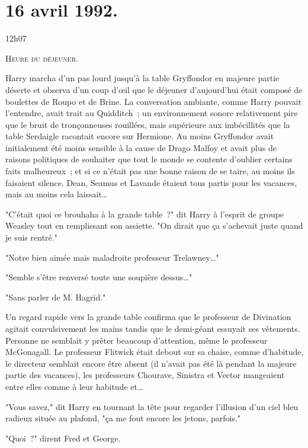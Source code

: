 
\section{16 avril 1992.}

12h07

\lettrine{H}{eure du déjeuner.}

\hplettrineextrapara
Harry marcha d'un pas lourd jusqu'à la table Gryffondor en majeure partie déserte et observa d'un coup d'œil que le déjeuner d'aujourd'hui était composé de boulettes de Roupo et de Brine. La conversation ambiante, comme Harry pouvait l'entendre, avait trait au Quidditch~; un environnement sonore relativement pire que le bruit de tronçonneuses rouillées, mais supérieure aux imbécillités que la table Serdaigle racontait encore sur Hermione. Au moins Gryffondor avait initialement été moins sensible à la cause de Drago Malfoy et avait plus de raisons politiques de souhaiter que tout le monde se contente d'oublier certains faits malheureux~; et si ce n'était pas une bonne raison de se taire, au moins ils faisaient silence. Dean, Seamus et Lavande étaient tous partis pour les vacances, mais au moins cela laissait…

"C'était quoi ce brouhaha à la grande table~?" dit Harry à l'esprit de groupe Weasley tout en remplissant son assiette. "On dirait que ça s'achevait juste quand je suis rentré."

"Notre bien aimée mais maladroite professeur Trelawney…"

"Semble s'être renversé toute une soupière dessus…"

"Sans parler de M. Hagrid."

Un regard rapide vers la grande table confirma que le professeur de Divination agitait convulsivement les mains tandis que le demi-géant essuyait ses vêtements. Personne ne semblait y prêter beaucoup d'attention, même le professeur McGonagall. Le professeur Flitwick était debout sur sa chaise, comme d'habitude, le directeur semblait encore être absent (il n'avait pas été là pendant la majeure partie des vacances), les professeurs Chourave, Sinistra et Vector mangeaient entre elles comme à leur habitude et…

"Vous savez," dit Harry en tournant la tête pour regarder l'illusion d'un ciel bleu radieux située au plafond, "ça me fout encore les jetons, parfois."

"Quoi~?" dirent Fred et George.

